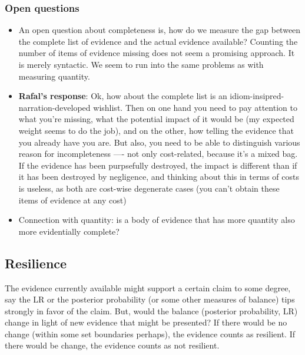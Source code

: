 \documentclass[
  10pt,
  dvipsnames,enabledeprecatedfontcommands]{scrartcl}
\begin{document}
\hypertarget{open-questions}{%
\subsubsection{Open questions}\label{open-questions}}

\begin{itemize}
\item
  An open question about completeness is, how do we measure the gap
  between the complete list of evidence and the actual evidence
  available? Counting the number of items of evidence missing does not
  seem a promising approach. It is merely syntactic. We seem to run into
  the same problems as with measuring quantity.
\item
  \textbf{Rafal's response}: Ok, how about the complete list is an
  idiom-insipred-narration-developed wishlist. Then on one hand you need
  to pay attention to what you're missing, what the potential impact of
  it would be (my expected weight seems to do the job), and on the
  other, how telling the evidence that you already have you are. But
  also, you need to be able to distinguish various reason for
  incompleteness ---- not only cost-related, because it's a mixed bag.
  If the evidence has been purpsefully destroyed, the impact is
  different than if it has been destroyed by negligence, and thinking
  about this in terms of costs is useless, as both are cost-wise
  degenerate cases (you can't obtain these items of evidence at any
  cost)
\item
  Connection with quantity: is a body of evidence that has more quantity
  also more evidentially complete?
\end{itemize}


\hypertarget{resilience}{%
\subsection{Resilience}\label{resilience}}

The evidence currently available might support a certain claim to some
degree, say the LR or the posterior probability (or some other measures
of balance) tips strongly in favor of the claim. But, would the balance
(posterior probability, LR) change in light of new evidence that might
be presented? If there would be no change (within some set boundaries
perhaps), the evidence counts as resilient. If there would be change,
the evidence counts as not resilient.
\end{document}

